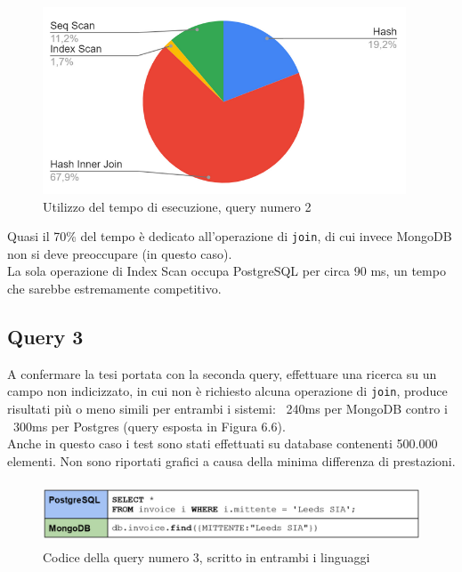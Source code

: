 \begin{figure}[htbp]
\begin{center}
\includegraphics[height=15em]{immagini/query/query2_results2.png}
\caption{Utilizzo del tempo di esecuzione, query numero 2}
\end{center}
\end{figure}

\noindent Quasi il 70\% del tempo è dedicato all'operazione di \texttt{join}, di cui invece MongoDB non si deve preoccupare (in questo caso).\\
La sola operazione di Index Scan occupa PostgreSQL per circa 90 ms, un tempo che sarebbe estremamente competitivo.\\


\subsection{Query 3}
A confermare la tesi portata con la seconda query, effettuare una ricerca su un campo non indicizzato, in cui non è richiesto alcuna operazione di \texttt{join}, produce risultati più o meno simili per entrambi i sistemi: ~240ms per MongoDB contro i ~300ms per Postgres (query esposta in Figura 6.6).\\
Anche in questo caso i test sono stati effettuati su database contenenti 500.000 elementi. Non sono riportati grafici a causa della minima differenza di prestazioni.\\

\begin{figure}[htbp]
\begin{center}
\includegraphics[height=5em]{immagini/query/query3.png}
\caption{Codice della query numero 3, scritto in entrambi i linguaggi}
\end{center}
\end{figure}

